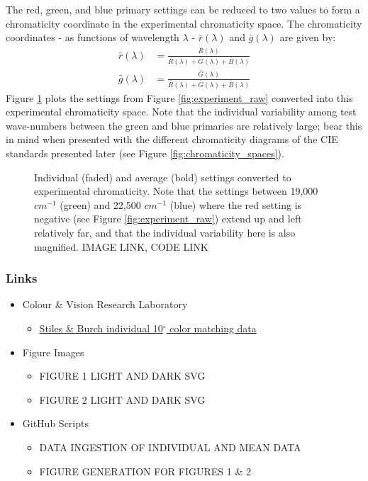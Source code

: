\documentclass[twocolumn]{article}
\newif\ifinvert
\begin{document}
The red, green, and blue primary settings can be reduced to two values to form a chromaticity coordinate in the experimental chromaticity space.  The chromaticity coordinates - as functions of wavelength $\lambda$ - $\bar{r}(\lambda)$ and $\bar{g}(\lambda)$ are given by:
\begin{equation}
    \begin{aligned}
        \bar{r}(\lambda)&=\frac{\bar{R}(\lambda)}{\bar{R}(\lambda)+\bar{G}(\lambda)+\bar{B}(\lambda)}\\
        \bar{g}(\lambda)&=\frac{\bar{G}(\lambda)}{\bar{R}(\lambda)+\bar{G}(\lambda)+\bar{B}(\lambda)}
    \end{aligned}
\end{equation}
Figure \ref{fig:experiment_chromaticity} plots the settings from Figure \ref{fig:experiment_raw} converted into this experimental chromaticity space.  Note that the individual variability among test wave-numbers between the green and blue primaries are relatively large; bear this in mind when presented with the different chromaticity diagrams of the CIE standards presented later (see Figure \ref{fig:chromaticity_spaces}).
\begin{figure}[h]
    \ifinvert
        
    \else
        
    \fi
    \caption{Individual (faded) and average (bold) settings converted to experimental chromaticity.  Note that the settings between 19,000 $cm^{-1}$ (green) and 22,500 $cm^{-1}$ (blue) where the red setting is negative (see Figure \ref{fig:experiment_raw}) extend up and left relatively far, and that the individual variability here is also magnified. IMAGE LINK, CODE LINK}\label{fig:experiment_chromaticity}
\end{figure}
\subsubsection{Links}
\begin{itemize}
    \item Colour \& Vision Research Laboratory
    \begin{itemize}
        \item \href{http://www.cvrl.org/stilesburch10_ind.htm}{Stiles \& Burch individual 10$^\circ$ color matching data}
    \end{itemize}
    \item Figure Images
    \begin{itemize}
        \item FIGURE 1 LIGHT AND DARK SVG
        \item FIGURE 2 LIGHT AND DARK SVG
    \end{itemize}
    \item GitHub Scripts
    \begin{itemize}
        \item DATA INGESTION OF INDIVIDUAL AND MEAN DATA
        \item FIGURE GENERATION FOR FIGURES 1 \& 2
    \end{itemize}
\end{itemize}
\end{document}
